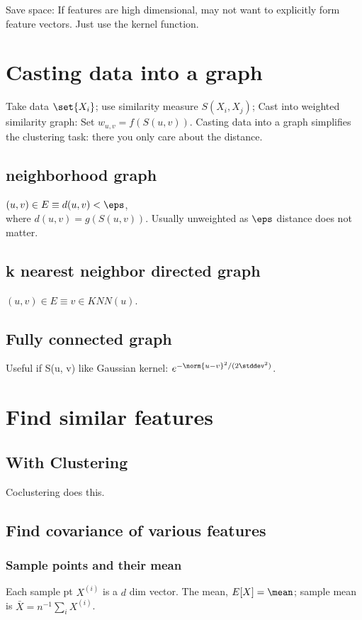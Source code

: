 \documentclass[oneside, article]{memoir}
\begin{document}
Save space: If features are high dimensional, may not want to explicitly form feature vectors. Just use the kernel function.

\section{Casting data into a graph}
Take data $\set{X_{i}}$; use similarity measure $S(X_{i}, X_{j})$; Cast into weighted similarity graph: Set $w_{u, v} = f(S(u, v))$. Casting data into a graph simplifies the clustering task: there you only care about the distance.

\subsection{ neighborhood graph}
$(u, v) \in E \equiv d(u, v) < \eps$, \\
where $d(u, v) = g(S(u, v))$. Usually unweighted as $\eps $ distance does not matter.

\subsection{k nearest neighbor directed graph}
$(u, v) \in E \equiv v \in KNN(u)$.

\subsection{Fully connected graph}
Useful if S(u, v) like Gaussian kernel: $e^{-\norm{u-v}^{2}/(2\stddev^{2})}$.

\section{Find similar features}
\subsection{With Clustering}
Coclustering does this.

\subsection{Find covariance of various features}
\subsubsection{Sample points and their mean}
Each sample pt $X^{(i)}$ is a $d$ dim vector. The mean, $E[X] = \mean$; sample mean is $\bar{X} = n^{-1} \sum_i X^{(i)}$.
\end{document}

